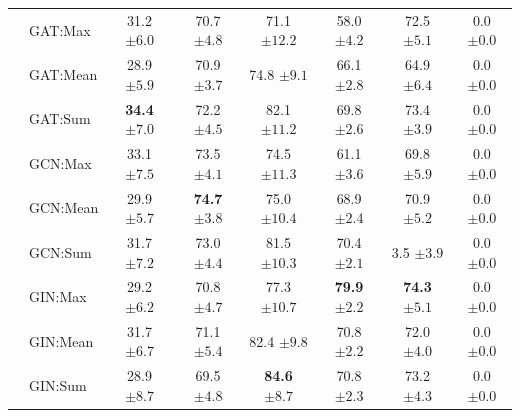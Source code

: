 \begin{table}[H]
{\begin{tabular}{@{}c <{\enspace}@{}lcccccc@{}}
			\multirow{9}{*}{\rotatebox{90}{Graph Neural Networks}} 
			& \textsf{GAT:Max}                    & 31.2 \scriptsize $\pm 6.0$        & 70.7 \scriptsize $\pm 4.8$          & 71.1 \scriptsize $\pm 12.2$ & 58.0 \scriptsize $\pm 4.2$          & 72.5 \scriptsize $\pm 5.1$         & 0.0 \scriptsize $\pm 0.0$  
			\\ 
			& \textsf{GAT:Mean}    & 28.9 \scriptsize $\pm 5.9$          & 70.9 \scriptsize $\pm 3.7$           & 74.8 \scriptsize $\pm 9.1$            & 66.1 \scriptsize $\pm 2.8$         & 64.9 \scriptsize $\pm 6.4$       & 0.0 \scriptsize $\pm 0.0$
			\\ 
			& \textsf{GAT:Sum}                  & \textbf{34.4} \scriptsize $\pm 7.0$          & 72.2 \scriptsize $\pm 4.5$	            & 82.1 \scriptsize $\pm 11.2$            & 69.8 \scriptsize $\pm 2.6$	          & 73.4 \scriptsize $\pm 3.9$
			& 0.0 \scriptsize $\pm 0.0$          
			\\
			
			\cmidrule{2-8}
					
			& \textsf{GCN:Max} & 33.1 \scriptsize $\pm 7.5$ &	73.5 \scriptsize $\pm 4.1$	& 74.5 \scriptsize $\pm 11.3$ & 61.1 \scriptsize $\pm 3.6$ &	69.8 \scriptsize $\pm 5.9$ & 0.0 \scriptsize $\pm 0.0$  
			\\ 
			& \textsf{GCN:Mean} & 29.9 \scriptsize $\pm 5.7$ &	\textbf{74.7} \scriptsize $\pm 3.8$ & 75.0 \scriptsize $\pm 10.4$ &	68.9 \scriptsize $\pm 2.4$ &	70.9 \scriptsize $\pm 5.2$ & 0.0 \scriptsize $\pm 0.0$
			\\ 
			& \textsf{GCN:Sum} & 31.7 \scriptsize $\pm 7.2$ &	73.0 \scriptsize $\pm 4.4$	& 81.5 \scriptsize $\pm 10.3$ & 70.4 \scriptsize $\pm 2.1$ & 3.5 \scriptsize $\pm 3.9$ & 0.0 \scriptsize $\pm 0.0$                        
			\\
			\cmidrule{2-8}	
						
			& \textsf{GIN:Max} & 29.2 \scriptsize $\pm 6.2$	& 70.8 \scriptsize $\pm 4.7$ & 77.3 \scriptsize $\pm 10.7$ & \textbf{79.9} \scriptsize $\pm 2.2$ & \textbf{74.3} \scriptsize $\pm 5.1$ & 0.0 \scriptsize $\pm 0.0$   
			\\ 
			& \textsf{GIN:Mean}  & 31.7 \scriptsize $\pm 6.7$	& 71.1 \scriptsize $\pm 5.4$ & 82.4 \scriptsize $\pm 9.8$ & 	70.8 \scriptsize $\pm 2.2$ & 72.0 \scriptsize $\pm 4.0$ & 0.0 \scriptsize $\pm 0.0$
			\\ 
			& \textsf{GIN:Sum} & 28.9 \scriptsize $\pm 8.7$ & 	69.5 \scriptsize $\pm 4.8$	& \textbf{84.6} \scriptsize $\pm 8.7$ & 70.8 \scriptsize $\pm 2.3$ &	73.2 \scriptsize $\pm 4.3$ & 0.0 \scriptsize $\pm 0.0$
			\\
			\bottomrule
		\end{tabular}}            
\end{table}

